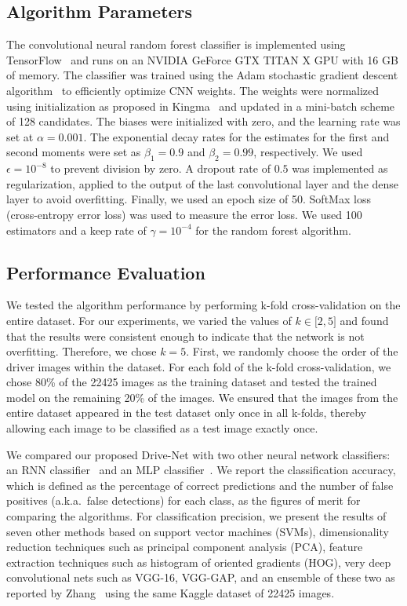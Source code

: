 \subsection{Algorithm Parameters}
The convolutional neural random forest classifier is implemented using TensorFlow~\cite{abadi_tensorflowlarge_2016} and runs on an NVIDIA GeForce GTX TITAN X GPU with 16 GB of memory. The classifier was trained using the Adam stochastic gradient descent algorithm~\cite{kingma_Adam_2014} to efficiently optimize CNN weights. The weights were normalized using initialization as proposed in Kingma~\cite{kingma_Adam_2014} and updated in a mini-batch scheme of 128 candidates. The biases were initialized with zero, and the learning rate was set at $\alpha = 0.001 $. The exponential decay rates for the estimates for the first and second moments were set as $\beta_1 = 0.9 $ and $\beta_2 = 0.99 $, respectively. We used $\epsilon = {10}^{-8} $ to prevent division by zero. A dropout rate of $0.5 $ was implemented as regularization, applied to the output of the last convolutional layer and the dense layer to avoid overfitting. Finally, we used an epoch size of 50.  SoftMax loss (cross-entropy error loss) was used to measure the error loss. We used 100 estimators and a keep rate of $\gamma = {10}^{-4} $ for the random forest algorithm.

\subsection{Performance Evaluation}
We tested the algorithm performance by performing k-fold cross-validation on the entire dataset. For our experiments, we varied the values of $k\in\lbrack2, 5 \rbrack $ and found that the results were consistent enough to indicate that the network is not overfitting. Therefore, we chose $k = 5 $. First, we randomly choose the order of the driver images within the dataset. For each fold of the k-fold cross-validation, we chose 80\% of the 22425 images as the training dataset and tested the trained model on the remaining 20\% of the images. We ensured that the images from the entire dataset appeared in the test dataset only once in all k-folds, thereby allowing each image to be classified as a test image exactly once.

We compared our proposed Drive-Net with two other neural network classifiers: an RNN classifier~\cite{liang_Recurrent_2015} and an MLP classifier~\cite{haykin_Neural_2009}. We report the classification accuracy, which is defined as the percentage of correct predictions and the number of false positives (a.k.a.\ false detections) for each class, as the figures of merit for comparing the algorithms. For classification precision, we present the results of seven other methods based on support vector machines (SVMs), dimensionality reduction techniques such as principal component analysis (PCA), feature extraction techniques such as histogram of oriented gradients (HOG), very deep convolutional nets such as VGG-16, VGG-GAP, and an ensemble of these two as reported by Zhang~\cite{zhang_Apply_2016} using the same Kaggle dataset of 22425 images.

